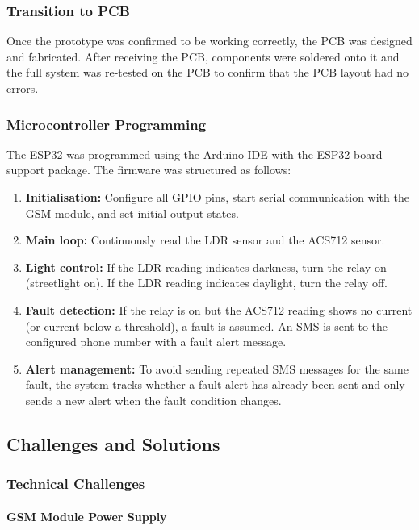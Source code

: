 \documentclass{article}
\begin{document}
\subsubsection{Transition to PCB}

Once the prototype was confirmed to be working correctly, the PCB was designed and fabricated. After receiving the PCB, components were soldered onto it and the full system was re-tested on the PCB to confirm that the PCB layout had no errors.

\subsubsection{Microcontroller Programming}

The ESP32 was programmed using the Arduino IDE with the ESP32 board support package. The firmware was structured as follows:

\begin{enumerate}
    \item \textbf{Initialisation:} Configure all GPIO pins, start serial communication with the GSM module, and set initial output states.
    \item \textbf{Main loop:} Continuously read the LDR sensor and the ACS712 sensor.
    \item \textbf{Light control:} If the LDR reading indicates darkness, turn the relay on (streetlight on). If the LDR reading indicates daylight, turn the relay off.
    \item \textbf{Fault detection:} If the relay is on but the ACS712 reading shows no current (or current below a threshold), a fault is assumed. An SMS is sent to the configured phone number with a fault alert message.
    \item \textbf{Alert management:} To avoid sending repeated SMS messages for the same fault, the system tracks whether a fault alert has already been sent and only sends a new alert when the fault condition changes.
\end{enumerate}

\subsection{Challenges and Solutions}

\subsubsection{Technical Challenges}

\paragraph{GSM Module Power Supply}
\end{document}

